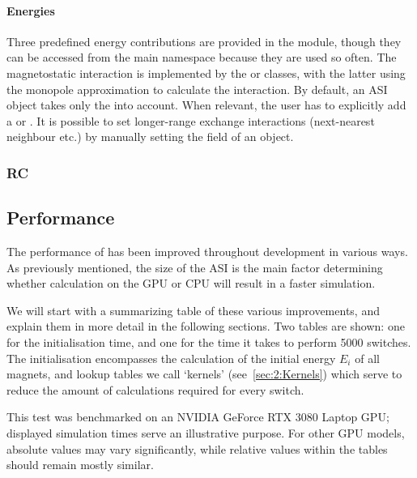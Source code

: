 \paragraph{Energies}\label{sec:2:API_energies}
Three predefined energy contributions are provided in the  module, though they can be accessed from the main  namespace because they are used so often.
The magnetostatic interaction is implemented by the  or  classes, with the latter using the monopole approximation to calculate the interaction.
By default, an ASI object takes only the  into account.
When relevant, the user has to explicitly add a  or .
It is possible to set longer-range exchange interactions (next-nearest neighbour etc.) by manually setting the  field of an  object.
\subsubsection{RC}
\subsection{Performance} %
The performance of \hotspice has been improved throughout development in various ways. As previously mentioned, the size of the ASI is the main factor determining whether calculation on the GPU or CPU will result in a faster simulation.

We will start with a summarizing table of these various improvements, and explain them in more detail in the following sections.
Two tables are shown: one for the initialisation time, and one for the time it takes to perform 5000 switches.
The initialisation encompasses the calculation of the initial energy $E_i$ of all magnets, and lookup tables we call `kernels' (see~\cref{sec:2:Kernels}) which serve to reduce the amount of calculations required for every switch.

This test was benchmarked on an NVIDIA GeForce RTX 3080 Laptop GPU; displayed simulation times serve an illustrative purpose. For other GPU models, absolute values may vary significantly, while relative values within the tables should remain mostly similar.

